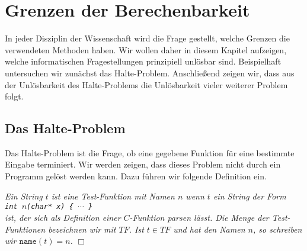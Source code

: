 \chapter{Grenzen der Berechenbarkeit}
In jeder Disziplin der Wissenschaft wird die Frage gestellt, welche Grenzen die
verwendeten Methoden haben.   Wir wollen daher in diesem Kapitel aufzeigen, welche
informatischen Fragestellungen prinzipiell unl\"osbar sind.  Beispielhaft untersuchen wir
zun\"achst das Halte-Problem.  Anschlie{\ss}end zeigen wir, dass aus der Unl\"osbarkeit
des Halte-Problems die Unl\"osbarkeit vieler weiterer Problem folgt.

\section{Das Halte-Problem}
Das Halte-Problem ist die Frage, ob eine gegebene Funktion f\"ur eine bestimmte Eingabe
terminiert.  Wir werden zeigen, dass dieses Problem nicht durch ein Programm gel\"ost werden
kann.  Dazu f\"uhren wir folgende Definition ein.

\begin{Definition} {\em Ein String $t$ ist eine \emph{Test-Funktion} mit Namen $n$ wenn $t$ ein
String der Form \\[0.3cm]
\hspace*{1.3cm} {\tt int $n$(char* x) \{ $\cdots$ \}} \\[0.3cm]
ist, der sich als Definition einer $C$-Funktion parsen l\"asst.  Die Menge der
Test-Funktionen bezeichnen wir mit $T\!F$.  Ist $t \in T\!F$ und hat den Namen $n$, so
schreiben wir $\mathtt{name}(t) = n$.} \hspace*{\fill} $\Box$
\end{Definition}

